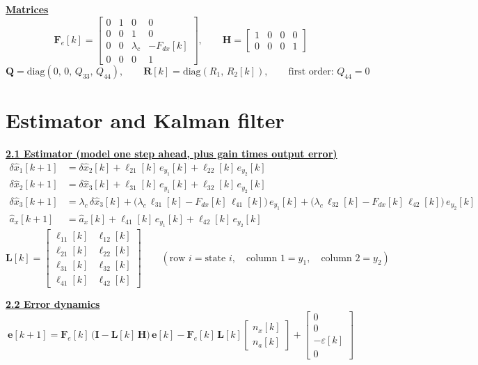 \documentclass[11pt,a4paper]{ctexart}
\newcommand{\lc}{\lambda_c}
\newcommand{\hd}[1]{\par\bigskip\noindent\underline{\textbf{#1}}}
\begin{document}
\hd{Matrices}
\[
\mathbf{F}_e[k] =
\begin{bmatrix}
0 & 1 & 0 & 0 \\
0 & 0 & 1 & 0 \\
0 & 0 & \lc & -F_{dx}[k] \\
0 & 0 & 0 & 1
\end{bmatrix},
\qquad
\mathbf{H} =
\begin{bmatrix}
1 & 0 & 0 & 0 \\
0 & 0 & 0 & 1
\end{bmatrix}
\]
\[
\mathbf{Q} = \mathrm{diag}(0,\, 0,\, Q_{33},\, Q_{44}),
\qquad
\mathbf{R}[k] = \mathrm{diag}(R_1,\, R_2[k]),
\qquad
\text{first order: } Q_{44} = 0
\]

\clearpage
\section{Estimator and Kalman filter}

\hd{2.1 Estimator (model one step ahead, plus gain times output error)}
\[
\begin{aligned}
\delta\hat x_1[k+1] &= \delta\hat x_2[k] + \ell_{21}[k]\,e_{y_1}[k] + \ell_{22}[k]\,e_{y_2}[k] \\
\delta\hat x_2[k+1] &= \delta\hat x_3[k] + \ell_{31}[k]\,e_{y_1}[k] + \ell_{32}[k]\,e_{y_2}[k] \\
\delta\hat x_3[k+1] &= \lc\,\delta\hat x_3[k] + \big(\lc\,\ell_{31}[k] - F_{dx}[k]\,\ell_{41}[k]\big)\,e_{y_1}[k] + \big(\lc\,\ell_{32}[k] - F_{dx}[k]\,\ell_{42}[k]\big)\,e_{y_2}[k] \\
\hat a_x[k+1] &= \hat a_x[k] + \ell_{41}[k]\,e_{y_1}[k] + \ell_{42}[k]\,e_{y_2}[k]
\end{aligned}
\]
\[
\mathbf{L}[k] = \begin{bmatrix}
\ell_{11}[k] & \ell_{12}[k] \\
\ell_{21}[k] & \ell_{22}[k] \\
\ell_{31}[k] & \ell_{32}[k] \\
\ell_{41}[k] & \ell_{42}[k]
\end{bmatrix}
\qquad (\text{row } i = \text{state } i, \quad \text{column } 1 = y_1, \quad \text{column } 2 = y_2)
\]

\hd{2.2 Error dynamics}
\[
\mathbf{e}[k+1] = \mathbf{F}_e[k]\,\big(\mathbf{I} - \mathbf{L}[k]\,\mathbf{H}\big)\,\mathbf{e}[k]
- \mathbf{F}_e[k]\,\mathbf{L}[k]\begin{bmatrix} n_x[k] \\ n_a[k] \end{bmatrix}
+ \begin{bmatrix} 0 \\ 0 \\ -\varepsilon[k] \\ 0 \end{bmatrix}
\]
\end{document}
